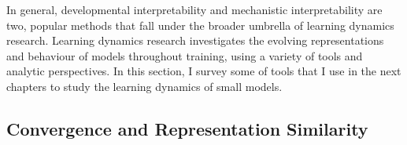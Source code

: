 In general, developmental interpretability and mechanistic interpretability are two, popular methods that fall under the broader umbrella of learning dynamics research. Learning dynamics research investigates the evolving representations and behaviour of models throughout training, using a variety of tools and analytic perspectives. In this section, I survey some of tools that I use in the next chapters to study the learning dynamics of small models.





\subsection{Convergence and Representation Similarity}

